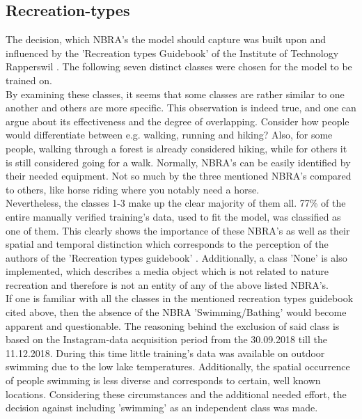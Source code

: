 \vspace{2cm}

\subsection{Recreation-types} \label{recreation_types}
The decision, which NBRA's the model should capture was built upon and influenced by the 'Recreation types Guidebook' of the Institute of Technology Rapperswil \parencite{IFL2018}. The following seven distinct classes were chosen for the model to be trained on.\\
\newline
By examining these classes, it seems that some classes are rather similar to one another and others are more specific. This observation is indeed true, and one can argue about its effectiveness and the degree of overlapping. Consider how people would differentiate between e.g. walking, running and hiking? Also, for some people, walking through a forest is already considered hiking, while for others it is still considered going for a walk. Normally, NBRA's can be easily identified by their needed equipment. Not so much by the three mentioned NBRA's compared to others, like horse riding where you notably need a horse.\\
Nevertheless, the classes 1-3 make up the clear majority of them all. 77\% of the entire manually verified training's data, used to fit the model, was classified as one of them. This clearly shows the importance of these NBRA's as well as their spatial and temporal distinction which corresponds to the perception of the authors of the 'Recreation types guidebook' \parencite{IFL2018}.
Additionally, a class 'None' is also implemented, which describes a media object which is not related to nature recreation and therefore is not an entity of any of the above listed NBRA's.\\
\newline
If one is familiar with all the classes in the mentioned recreation types guidebook cited above, then the absence of the NBRA 'Swimming/Bathing' would become apparent and questionable. The reasoning behind the exclusion of said class is based on the Instagram-data acquisition period from the 30.09.2018 till the 11.12.2018. During this time little training's data was available on outdoor swimming due to the low lake temperatures. Additionally, the spatial occurrence of people swimming is less diverse and corresponds to certain, well known locations. Considering these circumstances and the additional needed effort, the decision against including 'swimming' as an independent class was made.

